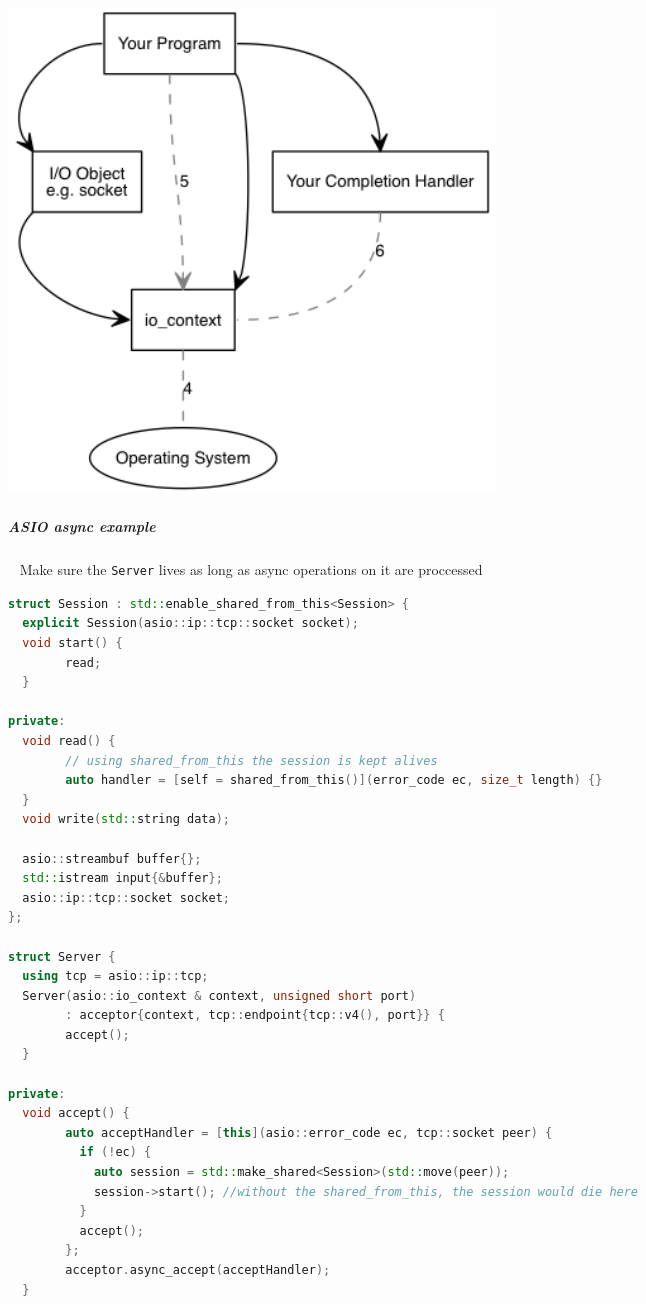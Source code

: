 \documentclass[11pt,twoside,landscape]{article}
\begin{document}
\begin{multicols}{2}
{
\begin{center}
\includegraphics[width=.9\linewidth]{img/async_operations_2.png}
\end{center}
\label{fig:asio-async-operations-part-2}
}
\subparagraph{ASIO async example} \
\label{sec:org3427343}
Make sure the \texttt{Server} lives as long as async operations on it are proccessed

\begin{lstlisting}[language=c++,label=lst:async-example-using-asio,caption={Async Example using ASIO},captionpos=b,numbers=none]
struct Session : std::enable_shared_from_this<Session> {
  explicit Session(asio::ip::tcp::socket socket);
  void start() {
        read;
  }

private:
  void read() {
        // using shared_from_this the session is kept alives
        auto handler = [self = shared_from_this()](error_code ec, size_t length) {}
  }
  void write(std::string data);

  asio::streambuf buffer{};
  std::istream input{&buffer};
  asio::ip::tcp::socket socket;
};

struct Server {
  using tcp = asio::ip::tcp;
  Server(asio::io_context & context, unsigned short port)
        : acceptor{context, tcp::endpoint{tcp::v4(), port}} {
        accept();
  }

private:
  void accept() {
        auto acceptHandler = [this](asio::error_code ec, tcp::socket peer) {
          if (!ec) {
            auto session = std::make_shared<Session>(std::move(peer));
            session->start(); //without the shared_from_this, the session would die here
          }
          accept();
        };
        acceptor.async_accept(acceptHandler);
  }


\end{lstlisting}
\end{multicols}
\end{document}
